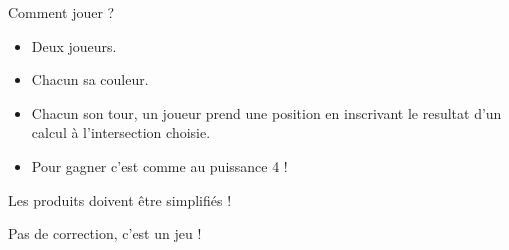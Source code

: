 \numeroteEnigme
\begin{enigme}
    Comment jouer ?
    \begin{itemize}
        \item Deux joueurs.
        \item Chacun sa couleur.
        \item Chacun son tour, un joueur prend une position en inscrivant le resultat d'un calcul à l'intersection choisie.
        \item Pour gagner c'est comme au puissance 4 !
    \end{itemize}
    \begin{myBox}{  }
        Les produits doivent être simplifiés !
    \end{myBox}

\end{enigme}

\addtocounter{exercice}{-1}
\begin{corrige}
Pas de correction, c'est un jeu !
\end{corrige}